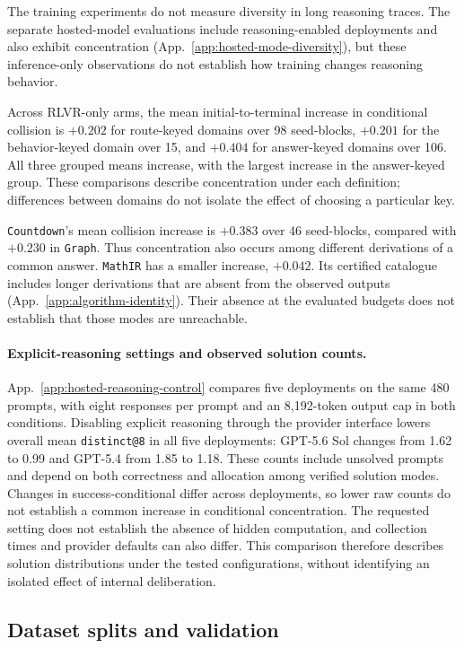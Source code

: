 The training experiments do not measure diversity in long reasoning traces.
The separate hosted-model evaluations include reasoning-enabled deployments
and also exhibit concentration (App.~\ref{app:hosted-mode-diversity}), but
these inference-only observations do not establish how training changes
reasoning behavior.

Across RLVR-only arms, the mean initial-to-terminal increase in conditional
collision is $+0.202$ for route-keyed domains over
98 seed-blocks, $+0.201$ for the behavior-keyed
domain over 15, and $+0.404$ for answer-keyed
domains over 106. All three grouped means increase, with the
largest increase in the answer-keyed group. These comparisons describe
concentration under each definition; differences between domains do not
isolate the effect of choosing a particular key.

\texttt{Countdown}'s mean collision increase is $+0.383$ over
46 seed-blocks, compared with $+0.230$ in \texttt{Graph}.
Thus concentration also occurs among different derivations of a common
answer. \texttt{MathIR} has a smaller increase, $+0.042$. Its certified
catalogue includes longer derivations that are absent from the observed
outputs (App.~\ref{app:algorithm-identity}). Their absence at the evaluated
budgets does not establish that those modes are unreachable.

\paragraph{Explicit-reasoning settings and observed solution counts.}
App.~\ref{app:hosted-reasoning-control} compares five deployments on the
same 480 prompts, with eight responses per prompt and an 8,192-token output
cap in both conditions. Disabling explicit reasoning through the provider
interface lowers overall mean \texttt{distinct@8} in all five deployments:
GPT-5.6 Sol changes from 1.62 to 0.99 and GPT-5.4 from 1.85 to 1.18.
These counts include unsolved prompts and depend on both correctness and
allocation among verified solution modes. Changes in success-conditional
\pmd{} differ across deployments, so lower raw counts do not establish a
common increase in conditional concentration. The requested setting does
not establish the absence of hidden computation, and collection times and
provider defaults can also differ. This comparison therefore describes
solution distributions under the tested configurations, without identifying
an isolated effect of internal deliberation.

\subsection{Dataset splits and validation}
\label{app:data-materialization}

